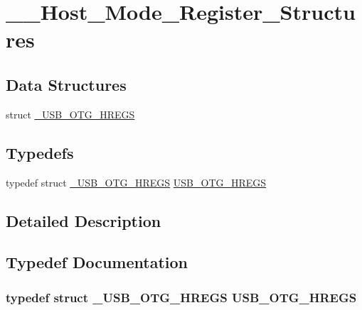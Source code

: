 \hypertarget{group_______host___mode___register___structures}{\section{\-\_\-\-\_\-\-Host\-\_\-\-Mode\-\_\-\-Register\-\_\-\-Structures}
\label{group_______host___mode___register___structures}
}
\subsection*{Data Structures}
\begin{DoxyCompactItemize}
\item 
struct \hyperlink{struct___u_s_b___o_t_g___h_r_e_g_s}{\-\_\-\-U\-S\-B\-\_\-\-O\-T\-G\-\_\-\-H\-R\-E\-G\-S}
\end{DoxyCompactItemize}
\subsection*{Typedefs}
\begin{DoxyCompactItemize}
\item 
typedef struct \hyperlink{struct___u_s_b___o_t_g___h_r_e_g_s}{\-\_\-\-U\-S\-B\-\_\-\-O\-T\-G\-\_\-\-H\-R\-E\-G\-S} \hyperlink{group_______host___mode___register___structures_ga5857dffb767c8009dc294a308941d078}{U\-S\-B\-\_\-\-O\-T\-G\-\_\-\-H\-R\-E\-G\-S}
\end{DoxyCompactItemize}


\subsection{Detailed Description}


\subsection{Typedef Documentation}
\hypertarget{group_______host___mode___register___structures_ga5857dffb767c8009dc294a308941d078}{
\subsubsection[{U\-S\-B\-\_\-\-O\-T\-G\-\_\-\-H\-R\-E\-G\-S}]{\setlength{\rightskip}{0pt plus 5cm}typedef struct {\bf \-\_\-\-U\-S\-B\-\_\-\-O\-T\-G\-\_\-\-H\-R\-E\-G\-S}
 {\bf U\-S\-B\-\_\-\-O\-T\-G\-\_\-\-H\-R\-E\-G\-S}}}\label{group_______host___mode___register___structures_ga5857dffb767c8009dc294a308941d078}
